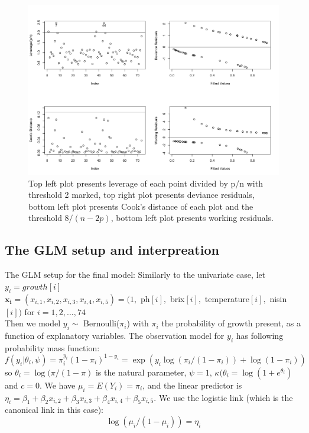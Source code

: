 \documentclass{article}
\begin{document}
\begin{figure}[h!]
\centering
\includegraphics[scale = 0.35]{RplotOut.png}
\caption{Top left plot presents leverage of each point divided by p/n with threshold 2 marked, top right plot presents deviance residuals, bottom left plot presents Cook's distance of each plot and the threshold $8/(n-2p)$, bottom left plot presents working residuals.}
\end{figure}


\subsection{The GLM setup and interpreation}

    The GLM setup for the final model: 
Similarly to the univariate case,  let  \\$y_i=growth[i] $   \\$ \boldsymbol{x_i}=(x_{i,1},x_{i,2},x_{i,3},x_{i,4},x_{i,5})=(1, $ ph$[i],$ brix$[i],$ temperature$[i],$ nisin$[i])$ for $i = 1, 2, ..., 74$\\ Then we model $y_{i} \sim$   Bernoulli($\pi_i$) with $\pi_i$ the probability of growth present, as a function of explanatory variables. The observation model for $y_i$ has following probability mass function:
$$ 
f(y_i|\theta_i,\psi)=\pi_i^{y_i}(1-\pi_i)^{1-y_i}= \exp(y_{i}\log(\pi_i/(1-\pi_i))+\log(1-\pi_i))
$$
so $\theta_i=\log(\pi/(1-\pi)$ is the natural parameter, $\psi=1$, $\kappa(\theta_i = \log(1+e^{\theta_i})$ and $c=0$. We have $\mu_i=E(Y_i)=\pi_i$, and the linear predictor is $\eta_i=\beta_1+\beta_2x_{i,2}+\beta_3x_{i,3}+\beta_4x_{i,4}+\beta_5x_{i,5}$. 
We use the logistic link (which is the canonical link in this case): 
$$
\log(\mu_i/(1-\mu_i))=\eta_i
$$
\end{document}
